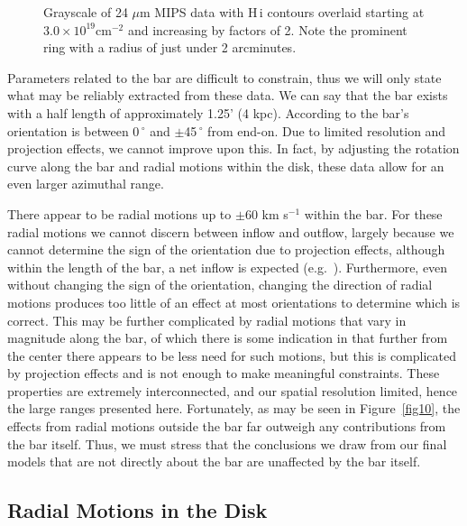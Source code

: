 \documentclass{emulateapj}
\begin{document}
\begin{figure}
\caption{Grayscale of 24 $\mu$m MIPS data with {\sc H\,i} contours overlaid starting at $3.0\times10^{19}\mathrm{cm^{-2}}$ and increasing by factors of 2.  Note the prominent ring with a radius of just under 2 arcminutes. \label{fig16}}
\end{figure}

\par
    Parameters related to the bar are difficult to constrain, thus we will only state what may be reliably extracted from these data.  We can say that the bar exists with a half length of approximately 1.25' (4 kpc).  According to \citet{1996A&A...310..725N} the bar's orientation is between 0$\,^{\circ}$ and $\pm$45$\,^{\circ}$ from end-on. Due to limited resolution and projection effects, we cannot improve upon this.  In fact, by adjusting the rotation curve along the bar and radial motions within the disk, these data allow for an even larger azimuthal range.  

\par
   There appear to be radial motions up to $\pm$60 km s$^{-1}$ within the bar.  For these radial motions we cannot discern between inflow and outflow, largely because we cannot determine the sign of the orientation due to projection effects, although within the length of the bar, a net inflow is expected (e.g.\ \citealt{1992MNRAS.259..328A}).  Furthermore, even without changing the sign of the orientation, changing the direction of radial motions produces too little of an effect at most orientations to determine which is correct.  This may be further complicated by radial motions that vary in magnitude along the bar, of which there is some indication in that further from the center there appears to be less need for such motions, but this is complicated by projection effects and is not enough to make meaningful constraints.  These properties are extremely interconnected, and our spatial resolution limited, hence the large ranges presented here. Fortunately, as may be seen in Figure~\ref{fig10}, the effects from radial motions outside the bar far outweigh any contributions from the bar itself.  Thus, we must stress that the conclusions we draw from our final models that are not directly about the bar are unaffected by the bar itself.


\subsection{Radial Motions in the Disk}  \label{Section6.6}
\end{document}
